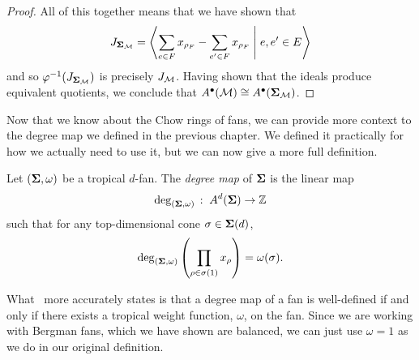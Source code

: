 \documentclass[12pt,oneside]{../../sfsuthesis}
\begin{document}
\begin{proof}
    All of this together means that we have shown that
    \[
        J_{{\bm{\Sigma}}_{\mathcal{M}}} = \left\langle \sum_{e \in F} x_{\rho_F} - \sum_{e' \in F} x_{\rho_F} \; \middle| \; e, e' \in E   \right\rangle
    \]
    and so \( \varphi^{-1}(J_{{\bm{\Sigma}}_{\mathcal{M}}}) \) is precisely \( J_{\mathcal{M}} \).
    Having shown that the ideals produce equivalent quotients, we conclude that \( A^\bullet(\mathcal{M}) \cong A^\bullet({\bm{\Sigma}}_{\mathcal{M}}) \).
\end{proof}

Now that we know about the Chow rings of fans, we can provide more context to the degree map we defined in the previous chapter.
We defined it practically for how we actually need to use it, but we can now give a more full definition.
\begin{definition}\th\label{def:degMapFan}
    Let \( ({\bm{\Sigma}}, \omega) \) be a tropical \( d \)-fan.
    The \emph{degree map} of \( {\bm{\Sigma}} \) is the linear map
    \[
        \deg_{({\bm{\Sigma}}, \omega)}\,:\; A^d({\bm{\Sigma}})  \to \mathbb{Z}
    \]
    such that for any top-dimensional cone \( \sigma \in {\bm{\Sigma}}(d) \),
    \[
        \deg_{({\bm{\Sigma}},\omega)}\left( \prod_{\rho \in \sigma(1)} x_\rho \right) = \omega(\sigma).
    \]
\end{definition}
What~\cite[Proposition~5.6]{adiprasitoHodgeTheoryCombinatorial2018} more accurately states is that a degree map of a fan is well-defined if and only if there exists a tropical weight function, \( \omega \), on the fan.
Since we are working with Bergman fans, which we have shown are balanced, we can just use \( \omega = 1 \) as we do in our original definition.
\end{document}
